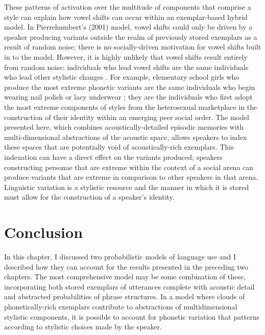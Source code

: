   
These patterns of activation over the multitude of components that comprise a style can explain how vowel shifts can occur within an exemplar-based hybrid model.  In Pierrehumbert's (2001) model, vowel shifts could only be driven by a speaker producing variants outside the realm of previously stored exemplars as a result of random noise; there is no socially-driven motivation for vowel shifts built in to the model.  However, it is highly unlikely that vowel shifts result entirely from random noise: individuals who lead vowel shifts are the same individuals who lead other stylistic changes \cite{labov2001}.  For example, elementary school girls who produce the most extreme phonetic variants are the same individuals who begin wearing nail polish or lacy underwear \cite{eckert1996nailpolish}; they are the individuals who first adopt the most extreme components of styles from the heterosexual marketplace in the construction of their identity within an emerging peer social order.  The model presented here, which combines acoustically-detailed episodic memories with multi-dimensional abstractions of the acoustic space, allows speakers to index these spaces that are potentially void of acoustically-rich exemplars.  This indexation can have a direct effect on the variants produced; speakers constructing personae that are extreme within the context of a social arena can produce variants that are extreme in comparison to other speakers in that arena.  Linguistic variation is a stylistic resource and the manner in which it is stored must allow for the construction of a speaker's identity.


\section{Conclusion}

In this chapter, I discussed two probabilistic models of language use and I described how they can account for the results presented in the preceding two chapters.  The most comprehensive model may be some combination of these, incorporating both stored exemplars of utterances complete with acoustic detail and abstracted probabilities of phrase structures.  In a model where clouds of phonetically-rich exemplars contribute to abstractions of multidimensional stylistic components, it is possible to account for phonetic variation that patterns according to stylistic choices made by the speaker.  



